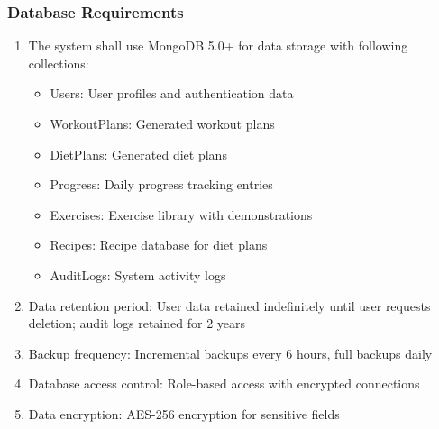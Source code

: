 \documentclass[12pt,a4paper]{article}
\begin{document}
\subsubsection{Database Requirements}
\begin{enumerate}
    \item The system shall use MongoDB 5.0+ for data storage with following collections:
    \begin{itemize}
        \item Users: User profiles and authentication data
        \item WorkoutPlans: Generated workout plans
        \item DietPlans: Generated diet plans
        \item Progress: Daily progress tracking entries
        \item Exercises: Exercise library with demonstrations
        \item Recipes: Recipe database for diet plans
        \item AuditLogs: System activity logs
    \end{itemize}
    \item Data retention period: User data retained indefinitely until user requests deletion; audit logs retained for 2 years
    \item Backup frequency: Incremental backups every 6 hours, full backups daily
    \item Database access control: Role-based access with encrypted connections
    \item Data encryption: AES-256 encryption for sensitive fields
\end{enumerate}
\end{document}
